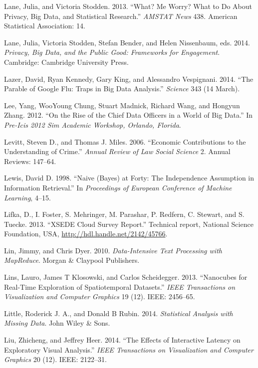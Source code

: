 \documentclass[]{krantz}
\begin{document}
\hypertarget{ref-lane2013me}{}
Lane, Julia, and Victoria Stodden. 2013. ``What? Me Worry? What to Do
About Privacy, Big Data, and Statistical Research.'' \emph{AMSTAT News}
438. American Statistical Association: 14.

\hypertarget{ref-lane2014}{}
Lane, Julia, Victoria Stodden, Stefan Bender, and Helen Nissenbaum, eds.
2014. \emph{Privacy, Big Data, and the Public Good: Frameworks for
Engagement}. Cambridge: Cambridge University Press.

\hypertarget{ref-lazer2014parable}{}
Lazer, David, Ryan Kennedy, Gary King, and Alessandro Vespignani. 2014.
``The Parable of Google Flu: Traps in Big Data Analysis.''
\emph{Science} 343 (14 March).

\hypertarget{ref-lee2012rise}{}
Lee, Yang, WooYoung Chung, Stuart Madnick, Richard Wang, and Hongyun
Zhang. 2012. ``On the Rise of the Chief Data Officers in a World of Big
Data.'' In \emph{Pre-Icis 2012 Sim Academic Workshop, Orlando, Florida}.

\hypertarget{ref-levitt2006economic}{}
Levitt, Steven D., and Thomas J. Miles. 2006. ``Economic Contributions
to the Understanding of Crime.'' \emph{Annual Review of Law Social
Science} 2. Annual Reviews: 147--64.

\hypertarget{ref-lewis-05}{}
Lewis, David D. 1998. ``Naive (Bayes) at Forty: The Independence
Assumption in Information Retrieval.'' In \emph{Proceedings of European
Conference of Machine Learning}, 4--15.

\hypertarget{ref-Lifka}{}
Lifka, D., I. Foster, S. Mehringer, M. Parashar, P. Redfern, C. Stewart,
and S. Tuecke. 2013. ``XSEDE Cloud Survey Report.'' Technical report,
National Science Foundation, USA,
\url{http://hdl.handle.net/2142/45766}.

\hypertarget{ref-lin2010data}{}
Lin, Jimmy, and Chris Dyer. 2010. \emph{Data-Intensive Text Processing
with MapReduce}. Morgan \& Claypool Publishers.

\hypertarget{ref-lins2013nanocubes}{}
Lins, Lauro, James T Klosowski, and Carlos Scheidegger. 2013.
``Nanocubes for Real-Time Exploration of Spatiotemporal Datasets.''
\emph{IEEE Transactions on Visualization and Computer Graphics} 19 (12).
IEEE: 2456--65.

\hypertarget{ref-little2014statistical}{}
Little, Roderick J. A., and Donald B Rubin. 2014. \emph{Statistical
Analysis with Missing Data}. John Wiley \& Sons.

\hypertarget{ref-liu2014effects}{}
Liu, Zhicheng, and Jeffrey Heer. 2014. ``The Effects of Interactive
Latency on Exploratory Visual Analysis.'' \emph{IEEE Transactions on
Visualization and Computer Graphics} 20 (12). IEEE: 2122--31.
\end{document}
